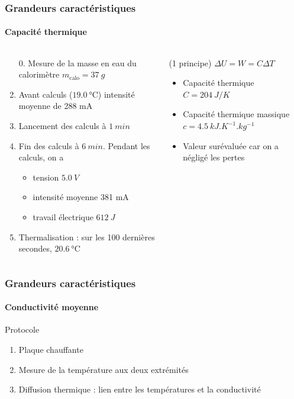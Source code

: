\documentclass[a4paper,11pt]{beamer}
\newcommand{\cel}{\degreeCelsius}
\begin{document}
\begin{frame}
    \frametitle{Grandeurs caractéristiques}
    \framesubtitle{Capacité thermique}

    \begin{columns}
        \begin{column}{0.55\textwidth}
            \begin{enumerate}
                \item[0.] Mesure de la masse en eau du calorimètre $m_\text{calo} = \SI{37}{g}$
                \item Avant calculs ($\SI{19,0}{\cel}$) intensité moyenne de 288 mA
                \item Lancement des calculs à $\SI{1}{min}$
                \item Fin des calculs à $\SI{6}{min}$. Pendant les calculs, on a
                \begin{itemize}
                    \item tension $\SI{5,0}{V}$
                    \item intensité moyenne 381 mA
                    \item travail électrique $\SI{612}{J}$
                \end{itemize}
                \item Thermalisation : sur les 100 dernières secondes, $\SI{20,6}{\cel}$
            \end{enumerate}
        \end{column}
        \vrule{}
        \begin{column}{0.45\textwidth}
            (1\ier{} principe) $\Delta U = W = C \Delta T$
            \begin{itemize}
                \item Capacité thermique $C = \SI{204}{J/K}$
                \item Capacité thermique massique $c = \SI{4,5}{kJ.K^{-1}.kg^{-1}}$
                \item Valeur surévaluée car on a négligé les pertes
            \end{itemize}
        \end{column}
    \end{columns}
\end{frame}

\begin{frame}
    \frametitle{Grandeurs caractéristiques}
    \framesubtitle{Conductivité moyenne}

    Protocole
    \begin{enumerate}
        \item Plaque chauffante
        \item Mesure de la température aux deux extrémités
        \item Diffusion thermique : lien entre les températures et la conductivité
    \end{enumerate}
\end{frame}
\end{document}
